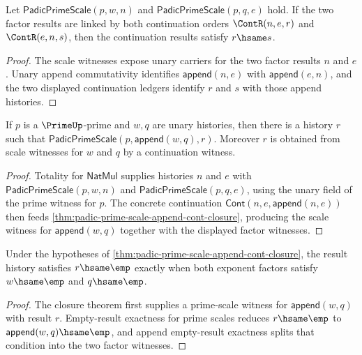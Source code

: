 \begin{theorem}
\label{thm:padic-prime-scale-append-factor-results-comm-hsame}
Let $\mathsf{PadicPrimeScale}(p,w,n)$ and
$\mathsf{PadicPrimeScale}(p,q,e)$ hold. If the two factor results are linked
by both continuation orders $\ContR(n,e,r)$ and $\ContR(e,n,s)$, then the
continuation results satisfy \(r\hsame s\).
\end{theorem}
\begin{proof}
The scale witnesses expose unary carriers for the two factor results \(n\) and
\(e\). Unary append commutativity identifies
\(\mathsf{append}(n,e)\) with \(\mathsf{append}(e,n)\), and the two displayed
continuation ledgers identify \(r\) and \(s\) with those append histories.
\end{proof}

\begin{theorem}
\label{thm:padic-prime-scale-append-total}
If \(p\) is a \(\PrimeUp\)-prime and \(w,q\) are unary histories, then there
is a history \(r\) such that
\(\mathsf{PadicPrimeScale}(p,\mathsf{append}(w,q),r)\). Moreover \(r\) is
obtained from scale witnesses for \(w\) and \(q\) by a continuation witness.
\end{theorem}
\begin{proof}
Totality for \(\mathsf{NatMul}\) supplies histories \(n\) and \(e\) with
\(\mathsf{PadicPrimeScale}(p,w,n)\) and
\(\mathsf{PadicPrimeScale}(p,q,e)\), using the unary field of the prime
witness for \(p\). The concrete continuation
\(\mathsf{Cont}(n,e,\mathsf{append}(n,e))\) then feeds
\autoref{thm:padic-prime-scale-append-cont-closure}, producing the scale
witness for \(\mathsf{append}(w,q)\) together with the displayed factor
witnesses.
\end{proof}

\begin{theorem}
\label{thm:padic-prime-scale-append-empty-result-empty-factors-iff}
Under the hypotheses of
\autoref{thm:padic-prime-scale-append-cont-closure}, the result history
satisfies \(r\hsame\emp\) exactly when both exponent factors satisfy
\(w\hsame\emp\) and \(q\hsame\emp\).
\end{theorem}
\begin{proof}
The closure theorem first supplies a prime-scale witness for
\(\mathsf{append}(w,q)\) with result \(r\). Empty-result exactness for prime
scales reduces \(r\hsame\emp\) to
\(\mathsf{append}(w,q)\hsame\emp\), and append empty-result exactness splits
that condition into the two factor witnesses.
\end{proof}

